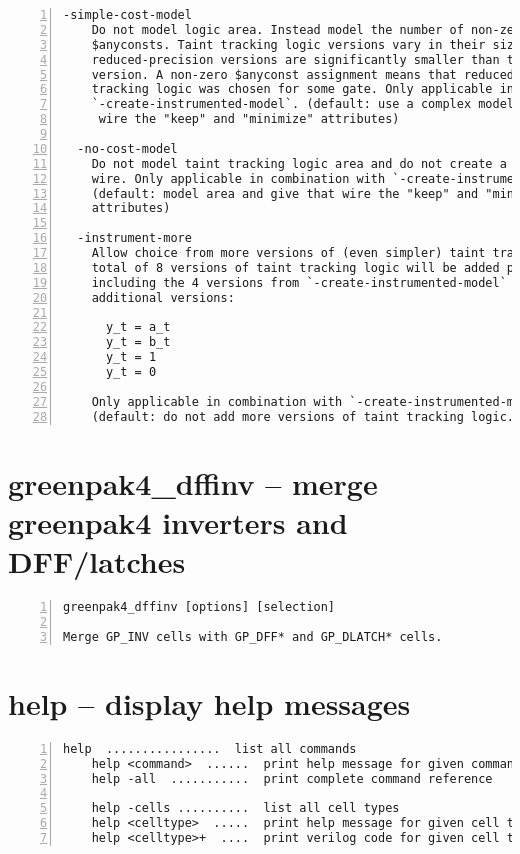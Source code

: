 \begin{lstlisting}[numbers=left,frame=single]
  -simple-cost-model
    Do not model logic area. Instead model the number of non-zero assignments to
    $anyconsts. Taint tracking logic versions vary in their size, but all
    reduced-precision versions are significantly smaller than the fully-precise
    version. A non-zero $anyconst assignment means that reduced-precision taint
    tracking logic was chosen for some gate. Only applicable in combination with
    `-create-instrumented-model`. (default: use a complex model and give that
     wire the "keep" and "minimize" attributes)

  -no-cost-model
    Do not model taint tracking logic area and do not create a `__glift_weight`
    wire. Only applicable in combination with `-create-instrumented-model`.
    (default: model area and give that wire the "keep" and "minimize"
    attributes)

  -instrument-more
    Allow choice from more versions of (even simpler) taint tracking logic. A
    total of 8 versions of taint tracking logic will be added per gate,
    including the 4 versions from `-create-instrumented-model` and these
    additional versions:

      y_t = a_t
      y_t = b_t
      y_t = 1
      y_t = 0

    Only applicable in combination with `-create-instrumented-model`.
    (default: do not add more versions of taint tracking logic.
\end{lstlisting}

\section{greenpak4\_dffinv -- merge greenpak4 inverters and DFF/latches}
\label{cmd:greenpak4_dffinv}
\begin{lstlisting}[numbers=left,frame=single]
    greenpak4_dffinv [options] [selection]

Merge GP_INV cells with GP_DFF* and GP_DLATCH* cells.
\end{lstlisting}

\section{help -- display help messages}
\label{cmd:help}
\begin{lstlisting}[numbers=left,frame=single]
    help  ................  list all commands
    help <command>  ......  print help message for given command
    help -all  ...........  print complete command reference

    help -cells ..........  list all cell types
    help <celltype>  .....  print help message for given cell type
    help <celltype>+  ....  print verilog code for given cell type
\end{lstlisting}

